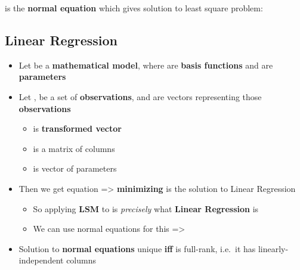 \hSep %

 is the \textbf{normal
      equation} which gives solution to least square problem:

\subsection*{Linear Regression}

\begin{itemize}

      \item
            Let  be a
            \textbf{mathematical model}, where  are \textbf{basis
                  functions} and  are \textbf{parameters}
      \item
            Let ,  be a
            set of \textbf{observations}, and
             are vectors
            representing those \textbf{observations}

            \begin{itemize}

                  \item
                         is \textbf{transformed vector}
                  \item
                        is a matrix of columns
                  \item
                         is vector of
                        parameters
            \end{itemize}
      \item
            Then we get equation  =\textgreater{}
            \textbf{minimizing}
             is the
            solution to Linear Regression

            \begin{itemize}

                  \item
                        So applying \textbf{LSM} to  is
                        \emph{precisely} what \textbf{Linear Regression} is
                  \item
                        We can use normal equations for this =\textgreater{}
            \end{itemize}
      \item
            Solution to \textbf{normal equations} unique \textbf{iff}  is
            full-rank, i.e.~it has linearly-independent columns
\end{itemize}
